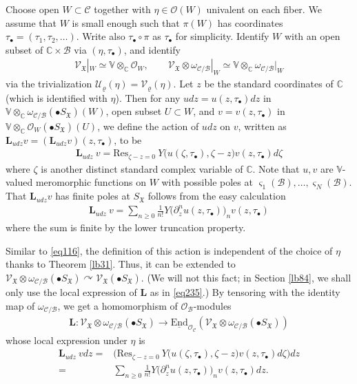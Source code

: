 \documentclass[12pt,b5paper,notitlepage]{report}
\theoremstyle{definition}
\theoremstyle{plain}
\newcommand{\fk}{\mathfrak}
\newcommand{\mc}{\mathcal}
\newcommand{\End}{\mathrm{End}} %
\newcommand{\Res}{\mathrm{Res}}
\newcommand{\scr}{\mathscr}
\newcommand{\sgm}{\varsigma}
\newcommand{\SX}{S_{\fk X}}
\newcommand{\mbf}{\mathbf}
\newcommand{\blt}{\bullet}
\newcommand{\Vbb}{\mathbb V}
\newcommand{\Cbb}{\mathbb C}
\numberwithin{equation}{section}
\begin{document}
Choose open $W\subset\mc C$  together with $\eta\in\scr O(W)$ univalent on each fiber. We assume that $W$ is small enough such that $\pi(W)$ has coordinates $\tau_\blt=(\tau_1,\tau_2,\dots)$. Write also $\tau_\blt\circ\pi$ as $\tau_\blt$ for simplicity. Identify $W$ with an open subset of $\Cbb\times\mc B$ via $(\eta,\tau_\blt)$, and identify 
\begin{gather*}
\scr V_{\fk X}|_W\simeq \Vbb\otimes_\Cbb\scr O_W,\qquad \scr V_{\fk X}\otimes\omega_{\mc C/\mc B}|_W\simeq \Vbb\otimes_\Cbb\omega_{\mc C/\mc B}|_W
\end{gather*}
via the trivialization $\mc U_\varrho(\eta)=\mc V_\varrho(\eta)$. Let $z$ be the standard coordinates of $\Cbb$ (which is identified with $\eta$). Then for any $udz=u(z,\tau_\blt)dz$ in $\Vbb\otimes_\Cbb\omega_{\mc C/\mc B}(\blt S_{\fk X})(W)$, open subset $U\subset W$, and $v=v(z,\tau_\blt)$ in $\Vbb\otimes_\Cbb\scr O_W(\blt S_{\fk X})(U)$, we define the action of $udz$ on $v$,  written as  $\mbf L_{udz} v=(\mbf L_{udz} v)(z,\tau_\blt)$, to be
\begin{align}
\mbf L_{udz}~v=\Res_{\zeta-z=0}~Y\big(u(\zeta,\tau_\blt),\zeta-z\big)v(z,\tau_\blt) d\zeta \label{eq148}
\end{align}
where $\zeta$ is another distinct standard complex variable of $\Cbb$. Note that $u,v$ are $\Vbb$-valued meromorphic functions on $W$ with possible poles at $\sgm_1(\mc B),\dots,\sgm_N(\mc B)$. That $\mbf L_{udz}v$ has finite poles at $\SX$ follows from the easy calculation
\begin{align}
\mbf L_{udz}~v=\sum_{n\geq 0}\frac 1{n!}Y\big(\partial_z^n u(z,\tau_\blt) \big)_n v(z,\tau_\blt)\label{eq235}
\end{align}
where the sum is finite by the lower truncation property.

Similar to \eqref{eq116}, the definition of this action is independent of the choice of $\eta$ thanks to Theorem \ref{lb31}. Thus,  it can be extended to $\scr V_{\fk X}\otimes\omega_{\mc C/\mc B}(\blt S_{\fk X})\curvearrowright \scr V_{\fk X}(\blt S_{\fk X})$. (We will not this fact; in Section \ref{lb84}, we shall only use the local expression of $\mbf L$ as in \eqref{eq235}.) By tensoring with the identity map of $\omega_{\mc C/\mc B}$, we get a homomorphism of $\scr O_{\mc B}$-modules
\begin{align*}
\mbf L:\scr V_{\fk X}\otimes\omega_{\mc C/\mc B}(\blt S_{\fk X})\rightarrow\underline{\End}_{\scr O_{\mc C}}(\scr V_{\fk X}\otimes\omega_{\mc C/\mc B}(\blt S_{\fk X}))
\end{align*}
whose local expression under $\eta$ is
\begin{align}
\mbf L_{udz}~vdz=&\Big(\Res_{\zeta-z=0}~Y\big(u(\zeta,\tau_\blt),\zeta-z\big)v(z,\tau_\blt) d\zeta\Big)dz\nonumber\\
=&\sum_{n\geq 0}\frac 1{n!}Y\big(\partial_z^n u(z,\tau_\blt) \big)_n v(z,\tau_\blt)dz.\label{eq149}
\end{align}
\end{document}
